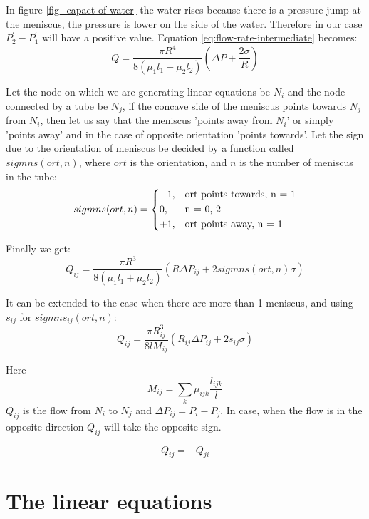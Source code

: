 \documentclass[12pt]{report}
\begin{document}
	In figure \ref{fig_capact-of-water} the water rises because there is a pressure jump at the meniscus, the pressure is lower on the side of the water. Therefore in our case $P^{'}_2 - P^{'}_1$ will have a positive value. Equation \ref{eq:flow-rate-intermediate} becomes:
	\begin{equation}
	Q = \frac{\pi R^4}{8({\mu}_1 l_1 + {\mu}_2 l_2)}(\Delta P + \frac{2\sigma}{R})
	\end{equation}

	Let the node on which we are generating linear equations be $N_i$ and the node connected by a tube be $N_j$, if the concave side of the meniscus points towards $N_j$ from $N_i$, then let us say that the meniscus 'points away from $N_i$' or simply 'points away' and in the case of opposite orientation 'points towards'. Let the sign due to the orientation of meniscus be decided by a function called $sigmns(ort, n)$, where $ort$ is the orientation, and $n$ is the number of meniscus in the tube:
	\begin{equation}
	sigmns(ort, n) = 
	\begin{dcases}
	-1,&\text{ort points towards, n = 1}\\
	0,&\text{n = 0, 2}\\
	+1,&\text{ort points away, n = 1}
	\end{dcases}
	\end{equation}

	Finally we get:
	\begin{equation} 
	Q_{ij} = \frac{\pi R^3}{8({\mu}_1 l_1 + {\mu}_2 l_2)}(R\Delta P_{ij} + 2sigmns(ort, n)\sigma)
	\end{equation}

	It can be extended to the case when there are more than 1 meniscus, and using $s_{ij}$ for $sigmns_{ij}(ort, n)$:
	\begin{equation} \label{eq:flow-rate-main}
	\boxed{Q_{ij} = \frac{\pi R_{ij}^3}{8lM_{ij}}(R_{ij}\Delta P_{ij} + 2s_{ij}\sigma)}
	\end{equation}

	Here
	\[ M_{ij} = \sum\limits_{k}{\mu}_{ijk} \frac{l_{ijk}}{l} \]
	$Q_{ij}$ is the flow from $N_i$ to $N_j$ and $\Delta P_{ij} = P_i - P_j$. In case, when the flow is in the opposite direction $Q_{ij}$ will take the opposite sign.

	\begin{equation}
	Q_{ij} = -Q_{ji}
	\end{equation}


\section{The linear equations} \label{sec:linear-equ}
\end{document}
